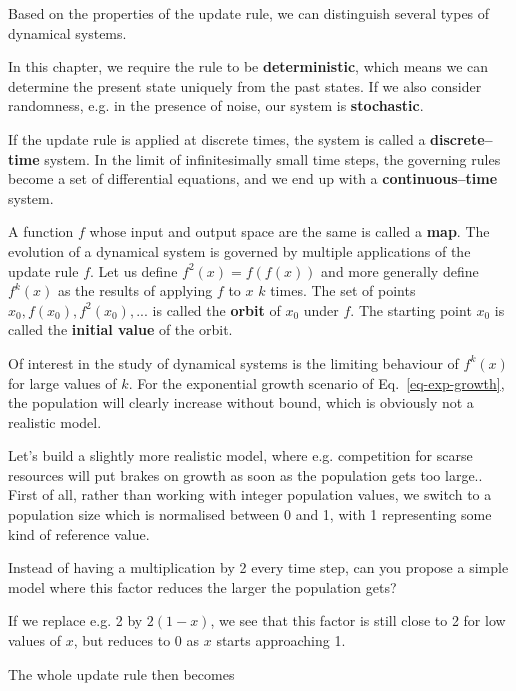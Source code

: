 Based on the properties of the update rule, we can distinguish several types of dynamical systems.

In this chapter, we require the rule to be \textbf{deterministic}, which means we can determine the present state uniquely from the past states. If we also consider randomness, e.g. in the presence of noise, our system is \textbf{stochastic}.

If the update rule is applied at discrete times, the system is called a \textbf{discrete--time} system. In the limit of infinitesimally small time steps, the governing rules become a set of differential equations, and we end up with a \textbf{continuous--time} system.

\pagebreak


A function $f$ whose input and output space are the same is called a \textbf{map}. The evolution of a dynamical system is governed by multiple applications of the update rule $f$. Let us define $f^2(x)=f(f(x))$ and more generally define $f^k(x)$ as the results of applying $f$ to $x$ $k$ times. The set of points ${x_0, f(x_0), f^2(x_0), ...}$ is called the \textbf{orbit} of $x_0$ under $f$. The starting point $x_0$ is called the \textbf{initial value} of the orbit.

Of interest in the study of dynamical systems is the limiting behaviour of $f^k(x)$ for large values of $k$. For the exponential growth scenario of Eq.~\ref{eq-exp-growth}, the population will clearly increase without bound, which is obviously not a realistic model.

Let's build a slightly more realistic model, where e.g. competition for scarse resources will put brakes on growth as soon as the population gets too large.. First of all, rather than working with integer population values, we switch to a population size which is normalised between 0 and 1, with 1 representing some kind of reference value.

\begin{cue}
Instead of having a multiplication by 2 every time step, can you propose a simple model where this factor reduces the larger the population gets? 
\end{cue}

If we replace e.g. 2 by $2(1-x)$, we see that this factor is still close to 2 for low values of $x$, but reduces to 0 as $x$ starts approaching 1.

The whole update rule then becomes

